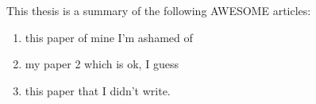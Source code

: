This thesis is a summary of the following AWESOME articles:

\begin{enumerate}[I]
    \item this paper of mine I'm ashamed of 
    \item my paper 2 which is ok, I guess
    \item this paper that I didn't write.
    
\end{enumerate}
